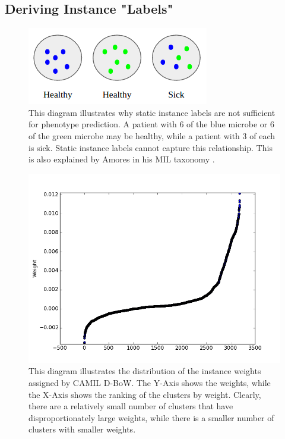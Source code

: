 \subsection{Deriving Instance "Labels"}

\begin{figure}[t]
\centering
\includegraphics[scale=0.5]{./instance-labels.png}
\caption{This diagram illustrates why static instance labels are not sufficient for phenotype prediction. A patient with 6 of the blue microbe or 6 of the green microbe may be healthy, while a patient with 3 of each is sick. Static instance labels cannot capture this relationship. This is also explained by Amores in his MIL taxonomy \cite{amores13}.} \label{instance-labels}
\end{figure}

\begin{figure}[h]
\centering
\includegraphics[scale=0.4]{./instance-scatter.png}
\caption{This diagram illustrates the distribution of the instance weights assigned by CAMIL D-BoW. The Y-Axis shows the weights, while the X-Axis shows the ranking of the clusters by weight. Clearly, there are a relatively small number of clusters that have disproportionately large weights, while there is a smaller number of clusters with smaller weights.} \label{instance-scatter}
\end{figure}

